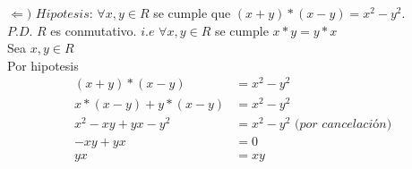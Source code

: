 \documentclass[12pt]{article}
\begin{document}
$\Longleftarrow)$ $Hipotesis$:  $\forall x, y \in R$ se cumple que $(x + y) \ast (x - y) = x^2 - y^2$.\\

$P.D$. $R$ es conmutativo. $i.e$ $\forall x, y \in R$ se cumple $x \ast y = y \ast x$\\

Sea $x, y \in R$\\

Por hipotesis
\begin{align*}
    (x + y) \ast (x - y) &= x^2 - y^2\\
    x \ast (x -y) + y \ast (x -y) &= x^2 - y^2\\
    x^2 -xy + yx -y^2 &= x^2 - y^2 \textit{ (por cancelación)}\\
    -xy + yx &= 0\\
    yx &= xy\\
\end{align*}
\vspace{1cm}
\end{document}
